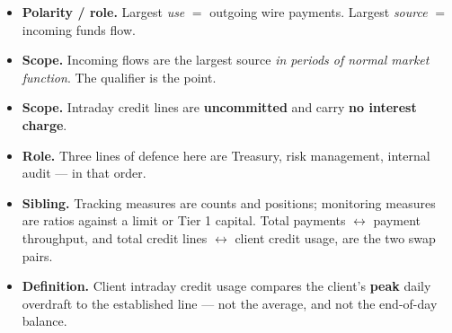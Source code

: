 \begin{lrtrapbox}
\begin{itemize}
\item \textbf{Polarity / role.} Largest \emph{use} $=$ outgoing wire payments. Largest \emph{source} $=$ incoming funds flow.
\item \textbf{Scope.} Incoming flows are the largest source \emph{in periods of normal market function}. The qualifier is the point.
\item \textbf{Scope.} Intraday credit lines are \textbf{uncommitted} and carry \textbf{no interest charge}.
\item \textbf{Role.} Three lines of defence here are Treasury, risk management, internal audit — in that order.
\item \textbf{Sibling.} Tracking measures are counts and positions; monitoring measures are ratios against a limit or Tier 1 capital. Total payments $\leftrightarrow$ payment throughput, and total credit lines $\leftrightarrow$ client credit usage, are the two swap pairs.
\item \textbf{Definition.} Client intraday credit usage compares the client's \textbf{peak} daily overdraft to the established line — not the average, and not the end-of-day balance.
\end{itemize}
\end{lrtrapbox}
